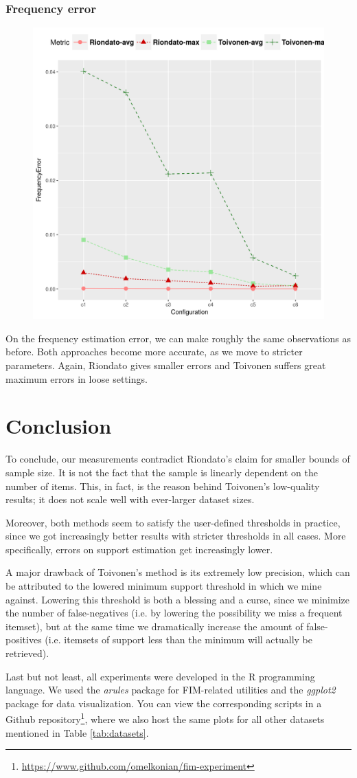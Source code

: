 \documentclass[11pt]{sigplanconf}
\newcommand{\site}[1]{\footnote{\url{#1}}}
\renewcommand\it{\textit}
\begin{document}
\subsubsection{Frequency error}
\begin{figure}[h!]
\centering
\includegraphics[width=.7\columnwidth]{kosarak.dat/freq.png}
\end{figure}
On the frequency estimation error, we can make roughly the same observations as before. Both approaches become more accurate, as we move to stricter parameters. Again, Riondato gives smaller errors and Toivonen suffers great maximum errors in loose settings.

\section{Conclusion}
To conclude, our measurements contradict Riondato's claim for smaller bounds of sample size. It is not the fact that the sample is linearly dependent on the number of items. This, in fact, is the reason behind Toivonen's low-quality results; it does not scale well with ever-larger dataset sizes.

Moreover, both methods seem to satisfy the user-defined thresholds in practice, since we got increasingly better results with stricter thresholds in all cases. More specifically, errors on support estimation get increasingly lower.

A major drawback of Toivonen's method is its extremely low precision, which can be attributed to the lowered minimum support threshold in which we mine against. Lowering this threshold is both a blessing and a curse, since we minimize the number of false-negatives (i.e. by lowering the possibility we miss a frequent itemset), but at the same time we dramatically increase the amount of false-positives (i.e. itemsets of support less than the minimum will actually be retrieved).

Last but not least, all experiments were developed in the R programming language. We used the \it{arules} package for FIM-related utilities and the \it{ggplot2} package for data visualization. You can view the corresponding scripts in a Github repository\site{https://www.github.com/omelkonian/fim-experiment}, where we also host the same plots for all other datasets mentioned in Table \ref{tab:datasets}.
\end{document}

